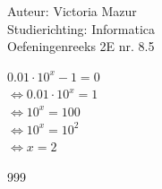 \documentclass[a4paper]{article}
\begin{document}
  
\noindent \large Auteur: Victoria Mazur \\
\noindent \large Studierichting: Informatica\\
\noindent \large Oefeningenreeks 2E nr. 8.5\\

\medskip

\normalsize

$0.01 \cdot 10^{x} - 1 = 0$ \\

$\Leftrightarrow 0.01 \cdot 10^{x} = 1$ \\

$\Leftrightarrow 10^{x} = 100$ \\

$\Leftrightarrow 10^{x} = 10^{2}$ \\

$\Leftrightarrow x = 2$ \\

\begin{thebibliography}{999}
\end{thebibliography}
\end{document}
